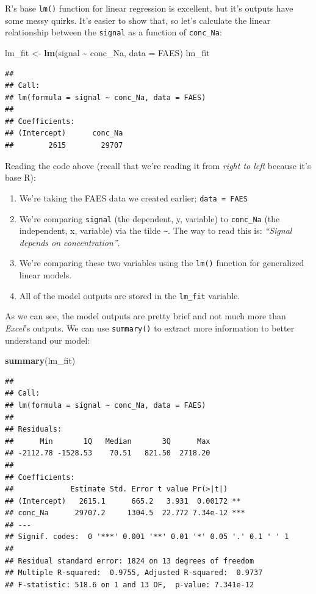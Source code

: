 \documentclass[
]{book}
\newenvironment{Shaded}{\begin{snugshade}}{\end{snugshade}}
\newcommand{\AttributeTok}[1]{\textcolor[rgb]{0.13,0.29,0.53}{#1}}
\newcommand{\FunctionTok}[1]{\textcolor[rgb]{0.13,0.29,0.53}{\textbf{#1}}}
\newcommand{\NormalTok}[1]{#1}
\newcommand{\OtherTok}[1]{\textcolor[rgb]{0.56,0.35,0.01}{#1}}
\newcommand{\SpecialCharTok}[1]{\textcolor[rgb]{0.81,0.36,0.00}{\textbf{#1}}}
\providecommand{\tightlist}{%
  \setlength{\itemsep}{0pt}\setlength{\parskip}{0pt}}
\begin{document}
R's base \texttt{lm()} function for linear regression is excellent, but it's outputs have some messy quirks. It's easier to show that, so let's calculate the linear relationship between the \texttt{signal} as a function of \texttt{conc\_Na}:

\begin{Shaded}
\begin{Highlighting}[]
\NormalTok{lm\_fit }\OtherTok{\textless{}{-}} \FunctionTok{lm}\NormalTok{(signal }\SpecialCharTok{\textasciitilde{}}\NormalTok{ conc\_Na, }\AttributeTok{data =}\NormalTok{ FAES)}
\NormalTok{lm\_fit}
\end{Highlighting}
\end{Shaded}

\begin{verbatim}
## 
## Call:
## lm(formula = signal ~ conc_Na, data = FAES)
## 
## Coefficients:
## (Intercept)      conc_Na  
##        2615        29707
\end{verbatim}

Reading the code above (recall that we're reading it from \emph{right to left} because it's base R):

\begin{enumerate}
\def\labelenumi{\arabic{enumi}.}
\tightlist
\item
  We're taking the FAES data we created earlier; \texttt{data\ =\ FAES}
\item
  We're comparing \texttt{signal} (the dependent, y, variable) to \texttt{conc\_Na} (the independent, x, variable) via the tilde \texttt{\textasciitilde{}}. The way to read this is: \emph{``Signal depends on concentration''}.
\item
  We're comparing these two variables using the \texttt{lm()} function for generalized linear models.
\item
  All of the model outputs are stored in the \texttt{lm\_fit} variable.
\end{enumerate}

As we can see, the model outputs are pretty brief and not much more than \emph{Excel}'s outputs. We can use \texttt{summary()} to extract more information to better understand our model:

\begin{Shaded}
\begin{Highlighting}[]
\FunctionTok{summary}\NormalTok{(lm\_fit)}
\end{Highlighting}
\end{Shaded}

\begin{verbatim}
## 
## Call:
## lm(formula = signal ~ conc_Na, data = FAES)
## 
## Residuals:
##      Min       1Q   Median       3Q      Max 
## -2112.78 -1528.53    70.51   821.50  2718.20 
## 
## Coefficients:
##             Estimate Std. Error t value Pr(>|t|)    
## (Intercept)   2615.1      665.2   3.931  0.00172 ** 
## conc_Na      29707.2     1304.5  22.772 7.34e-12 ***
## ---
## Signif. codes:  0 '***' 0.001 '**' 0.01 '*' 0.05 '.' 0.1 ' ' 1
## 
## Residual standard error: 1824 on 13 degrees of freedom
## Multiple R-squared:  0.9755, Adjusted R-squared:  0.9737 
## F-statistic: 518.6 on 1 and 13 DF,  p-value: 7.341e-12
\end{verbatim}
\end{document}
